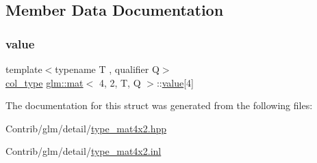 \subsection{Member Data Documentation}
\mbox{\label{structglm_1_1mat_3_014_00_012_00_01_t_00_01_q_01_4_aa505bcd34286dbc23f599a6510908853}} 
\subsubsection{\texorpdfstring{value}{value}}
{\footnotesize\ttfamily template$<$typename T , qualifier Q$>$ \\
\mbox{\hyperlink{structglm_1_1mat_3_014_00_012_00_01_t_00_01_q_01_4_a60138ab077eb3bef96e654e672af5059}{col\+\_\+type}} \mbox{\hyperlink{structglm_1_1mat}{glm\+::mat}}$<$ 4, 2, T, Q $>$\+::\mbox{\hyperlink{_s_d_l__opengl__glext_8h_a8ad81492d410ff2ac11f754f4042150f}{value}}\mbox{[}4\mbox{]}\hspace{0.3cm}{\ttfamily [private]}}



The documentation for this struct was generated from the following files\+:\begin{DoxyCompactItemize}
\item 
Contrib/glm/detail/\mbox{\hyperlink{type__mat4x2_8hpp}{type\+\_\+mat4x2.\+hpp}}\item 
Contrib/glm/detail/\mbox{\hyperlink{type__mat4x2_8inl}{type\+\_\+mat4x2.\+inl}}\end{DoxyCompactItemize}
